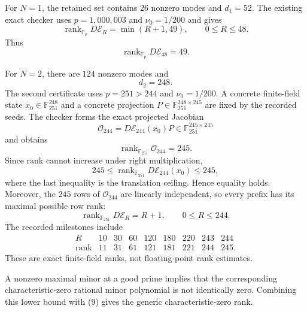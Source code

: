 \documentclass[10pt,leqno,twoside]{article}
\newcommand{\F}{\mathbb F}
\theoremstyle{plain}
\theoremstyle{remark}
\begin{document}
For $N=1$, the retained set contains $26$ nonzero modes and $d_1=52$.  The existing exact
checker uses $p=1{,}000{,}003$ and $\nu_0=1/200$ and gives
\begin{equation}
\boxed{\operatorname{rank}_{\F_p}D\mathcal E_R=\min(R+1,49),\qquad 0\le R\le48.}
\end{equation}
Thus
\begin{equation}
\boxed{\operatorname{rank}_{\F_p}D\mathcal E_{48}=49.}
\end{equation}

For $N=2$, there are $124$ nonzero modes and
\begin{equation}
\boxed{d_2=248.}
\end{equation}
The second certificate uses $p=251>244$ and $\nu_0=1/200$.  A concrete finite-field state
$x_0\in\F_{251}^{248}$ and a concrete projection
$P\in\F_{251}^{248\times245}$ are fixed by the recorded seeds.  The checker forms the exact
projected Jacobian
\begin{equation}
\mathcal O_{244}=D\mathcal E_{244}(x_0)P\in\F_{251}^{245\times245}
\end{equation}
and obtains
\begin{equation}
\boxed{\operatorname{rank}_{\F_{251}}\mathcal O_{244}=245.}
\end{equation}
Since rank cannot increase under right multiplication,
\begin{equation}
245\le \operatorname{rank}_{\F_{251}}D\mathcal E_{244}(x_0)\le245,
\end{equation}
where the last inequality is the translation ceiling.  Hence equality holds.  Moreover, the
$245$ rows of $\mathcal O_{244}$ are linearly independent, so every prefix has its maximal
possible row rank:
\begin{equation}
\boxed{\operatorname{rank}_{\F_{251}}D\mathcal E_R=R+1,\qquad0\le R\le244.}
\end{equation}
The recorded milestones include
\begin{equation}
\begin{array}{c|rrrrrrrr}
R&10&30&60&120&180&220&243&244\\ \hline
\operatorname{rank}&11&31&61&121&181&221&244&245.
\end{array}
\end{equation}
These are exact finite-field ranks, not floating-point rank estimates.

A nonzero maximal minor at a good prime implies that the corresponding characteristic-zero
rational minor polynomial is not identically zero.  Combining this lower bound with (9) gives
the generic characteristic-zero rank.
\end{document}
